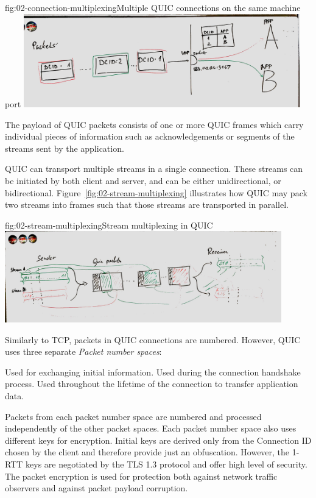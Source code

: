 \begin{myFigure}{fig:02-connection-multiplexing}{Multiple QUIC connections on the same machine port}
  \includegraphics[width=0.9\textwidth]{img/02-socket-multiplexing}
\end{myFigure}

The payload of QUIC packets consists of one or more QUIC frames which carry individual pieces of
information such as acknowledgements or segments of the streams sent by the application.

QUIC can transport multiple streams in a single connection. These streams can be initiated by both
client and server, and can be either unidirectional, or bidirectional.
Figure~\ref{fig:02-stream-multiplexing} illustrates how QUIC may pack two streams into frames such
that those streams are transported in parallel.

\begin{myFigure}{fig:02-stream-multiplexing}{Stream multiplexing in QUIC}
  \includegraphics[width=0.9\textwidth]{img/02-stream-multiplexing}
\end{myFigure}

Similarly to TCP, packets in QUIC connections are numbered. However, QUIC uses three separate
\textit{Packet number spaces}:

\begin{enumerate}
   Used for exchanging initial information.
   Used during the connection handshake process.
   Used throughout the lifetime of the connection to transfer application data.
\end{enumerate}

Packets from each packet number space are numbered and processed independently of the other packet
spaces. Each packet number space also uses different keys for encryption. Initial keys are derived
only from the Connection ID chosen by the client and therefore provide just an obfuscation. However,
the 1-RTT keys are negotiated by the TLS 1.3 protocol and offer high level of security. The packet
encryption is used for protection both against network traffic observers and against packet payload
corruption.

